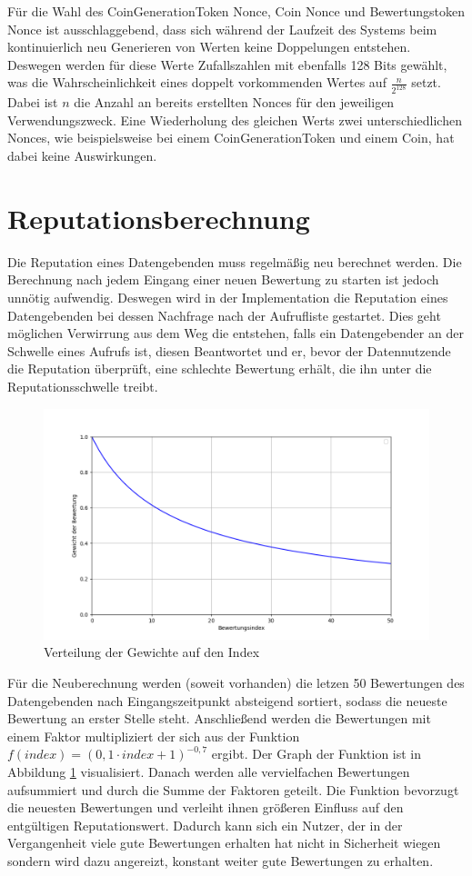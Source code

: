 \documentclass{scrreprt}
\begin{document}
Für die Wahl des CoinGenerationToken Nonce, Coin Nonce und Bewertungstoken Nonce ist ausschlaggebend, dass sich während der Laufzeit des Systems beim kontinuierlich neu Generieren von Werten keine Doppelungen entstehen. Deswegen werden für diese Werte Zufallszahlen mit ebenfalls 128 Bits gewählt, was die Wahrscheinlichkeit eines doppelt vorkommenden Wertes auf $\frac{n}{2^{128}}$ setzt. Dabei ist $n$ die Anzahl an bereits erstellten Nonces für den jeweiligen Verwendungszweck. Eine Wiederholung des gleichen Werts zwei unterschiedlichen Nonces, wie beispielsweise bei einem CoinGenerationToken und einem Coin, hat dabei keine Auswirkungen.

\section{Reputationsberechnung}
Die Reputation eines Datengebenden muss regelmäßig neu berechnet werden. Die Berechnung nach jedem Eingang einer neuen Bewertung zu starten ist jedoch unnötig aufwendig. Deswegen wird in der Implementation die Reputation eines Datengebenden bei dessen Nachfrage nach der Aufrufliste gestartet. Dies geht möglichen Verwirrung aus dem Weg die entstehen, falls ein Datengebender an der Schwelle eines Aufrufs ist, diesen Beantwortet und er, bevor der Datennutzende die Reputation überprüft, eine schlechte Bewertung erhält, die ihn unter die Reputationsschwelle treibt.

\begin{figure}[h]
    \centering
    \label{fig:reputationWeights}
    \includegraphics[width=0.8\linewidth]{ReputationWeights.png}
    \caption{Verteilung der Gewichte auf den Index}
\end{figure}

Für die Neuberechnung werden (soweit vorhanden) die letzen 50 Bewertungen des Datengebenden nach Eingangszeitpunkt absteigend sortiert, sodass die neueste Bewertung an erster Stelle steht. Anschließend werden die Bewertungen mit einem Faktor multipliziert der sich aus der Funktion $f(index)=(0,1\cdot index + 1)^{-0,7}$ ergibt. Der Graph der Funktion ist in Abbildung \ref{fig:reputationWeights} visualisiert. Danach werden alle vervielfachen Bewertungen aufsummiert und durch die Summe der Faktoren geteilt. Die Funktion bevorzugt die neuesten Bewertungen und verleiht ihnen größeren Einfluss auf den entgültigen Reputationswert. Dadurch kann sich ein Nutzer, der in der Vergangenheit viele gute Bewertungen erhalten hat nicht in Sicherheit wiegen sondern wird dazu angereizt, konstant weiter gute Bewertungen zu erhalten.
\end{document}
